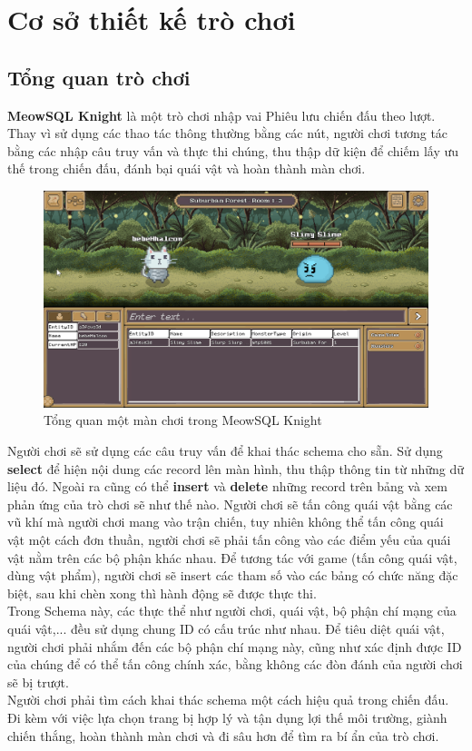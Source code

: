 \section{Cơ sở thiết kế trò chơi}
\subsection{Tổng quan trò chơi}
\hspace*{1cm} \textbf{MeowSQL Knight} là một trò chơi nhập vai Phiêu lưu chiến đấu theo lượt. Thay vì sử dụng các thao tác thông thường bằng các nút, người chơi tương tác bằng các nhập câu truy vấn và thực thi chúng, thu thập dữ kiện để chiếm lấy ưu thế trong chiến đấu, đánh bại quái vật và hoàn thành màn chơi.\\
\begin{figure}[H]
	\centering
	\includegraphics[width=\textwidth]{Images/Overall.png}
	\vspace{0.5cm}
	\caption{Tổng quan một màn chơi trong MeowSQL Knight}
\end{figure}
\hspace*{1cm} Người chơi sẽ sử dụng các câu truy vấn để khai thác schema cho sẵn. Sử dụng \textbf{select} để hiện nội dung các record lên màn hình, thu thập thông tin từ những dữ liệu đó. Ngoài ra cũng có thể \textbf{insert} và \textbf{delete} những record trên bảng và xem phản ứng của trò chơi sẽ như thế nào. Người chơi sẽ tấn công quái vật bằng các vũ khí mà người chơi mang vào trận chiến, tuy nhiên không thể tấn công quái vật một cách đơn thuần, người chơi sẽ phải tấn công vào các điểm yếu của quái vật nằm trên các bộ phận khác nhau. Để tương tác với game (tấn công quái vật, dùng vật phẩm), người chơi sẽ insert các tham số vào các bảng có chức năng đặc biệt, sau khi chèn xong thì hành động sẽ được thực thi.\\
\hspace*{1cm} Trong Schema này, các thực thể như người chơi, quái vật, bộ phận chí mạng của quái vật,... đều sử dụng chung ID có cấu trúc như nhau. Để tiêu diệt quái vật, người chơi phải nhắm đến các bộ phận chí mạng này, cũng như xác định được ID của chúng để có thể tấn công chính xác, bằng không các đòn đánh của người chơi sẽ bị trượt.\\
\hspace*{1cm} Người chơi phải tìm cách khai thác schema một cách hiệu quả trong chiến đấu. Đi kèm với việc lựa chọn trang bị hợp lý và tận dụng lợi thế môi trường, giành chiến thắng, hoàn thành màn chơi và đi sâu hơn để tìm ra bí ẩn của trò chơi.


